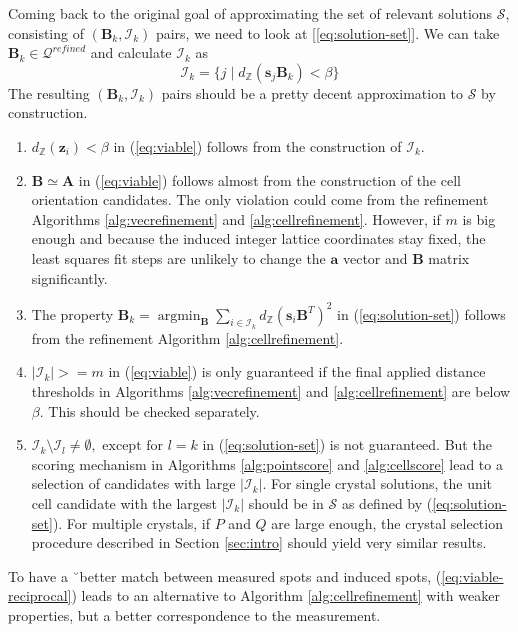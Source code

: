 \documentclass[a4paper,10pt]{article}
\DeclareMathOperator*{\argmin}{argmin}
\newcommand{\vect}[1]{\mathbf{#1}}
\newcommand{\mat}[1]{\mathbf{#1}}
\newcommand{\distZ}[1]{d_\mathbb{Z}(#1)}
\begin{document}
Coming back to the original goal of approximating the set of relevant solutions $\mathcal{S}$, consisting of $(\mat{B}_k, \mathcal{I}_k)$ pairs, we need to look at [\ref{eq:solution-set}]. We can take $\mat{B}_k\in \mathcal{Q}^{refined}$ and calculate $\mathcal{I}_k$ as
%
\[
 \mathcal{I}_k = \{ j \mid \distZ{\vect{s}_j\mat{B}_k} < \beta \}
\]
%
The resulting $(\mat{B}_k, \mathcal{I}_k)$ pairs should be a pretty decent approximation to $\mathcal{S}$ by construction.
%
\begin{enumerate}
 \item $\distZ{\vect{z}_i} < \beta$ in (\ref{eq:viable}) follows from the construction of $\mathcal{I}_k$.
 \item $\mat{B} \simeq \mat{A}$ in (\ref{eq:viable}) follows almost from the construction of the cell orientation candidates. The only violation could come from the refinement Algorithms \ref{alg:vecrefinement} and \ref{alg:cellrefinement}. However, if $m$ is big enough and because the induced integer lattice coordinates stay fixed, the least squares fit steps are unlikely to change the $\vect{a}$ vector and $\mat{B}$ matrix significantly.
 \item The property $\mat{B}_k = \argmin_{\mat{B}} \sum_{i\in \mathcal{I}_k} \distZ{\vect{s}_i\mat{B}^T}^2$ in (\ref{eq:solution-set}) follows from the refinement Algorithm \ref{alg:cellrefinement}.
 \item $|\mathcal{I}_k| >= m$ in (\ref{eq:viable}) is only guaranteed if the final applied distance thresholds in Algorithms \ref{alg:vecrefinement} and \ref{alg:cellrefinement} are below $\beta$. This should be checked separately.
 \item $\mathcal{I}_k \setminus \mathcal{I}_l \neq \emptyset,\text{ except for }l=k$ in (\ref{eq:solution-set}) is not guaranteed. But the scoring mechanism in Algorithms \ref{alg:pointscore} and \ref{alg:cellscore} lead to a selection of candidates with large $|\mathcal{I}_k|$. For single crystal solutions, the unit cell candidate with the largest $|\mathcal{I}_k|$ should be in $\mathcal{S}$ as defined by (\ref{eq:solution-set}). For multiple crystals, if $P$ and $Q$ are large enough, the crystal selection procedure described in Section \ref{sec:intro} should yield very similar results.
\end{enumerate}
%
To have a ˘better match between measured spots and induced spots, (\ref{eq:viable-reciprocal}) leads to an alternative to Algorithm \ref{alg:cellrefinement} with weaker properties, but a better correspondence to the measurement.
\end{document}
